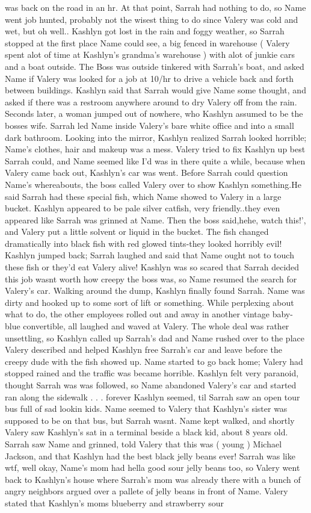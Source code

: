 \documentclass[12pt]{book}
\begin{document}
was back on the road in an hr. At that point, Sarrah had nothing to do, so Name went job hunted, probably not the wisest thing to do since Valery was cold and wet, but oh well.. Kashlyn got lost in the rain and foggy weather, so Sarrah stopped at the first place Name could see, a big fenced in warehouse ( Valery spent alot of time at Kashlyn's grandma's warehouse ) with alot of junkie cars and a boat outside. The Boss was outside tinkered with Sarrah's boat, and asked Name if Valery was looked for a job at 10/hr to drive a vehicle back and forth between buildings. Kashlyn said that Sarrah would give Name some thought, and asked if there was a restroom anywhere around to dry Valery off from the rain. Seconds later, a woman jumped out of nowhere, who Kashlyn assumed to be the bosses wife. Sarrah led Name inside Valery's bare white office and into a small dark bathroom. Looking into the mirror, Kashlyn realized Sarrah looked horrible; Name's clothes, hair and makeup was a mess. Valery tried to fix Kashlyn up best Sarrah could, and Name seemed like I'd was in there quite a while, because when Valery came back out, Kashlyn's car was went. Before Sarrah could question Name's whereabouts, the boss called Valery over to show Kashlyn something.He said Sarrah had these special fish, which Name showed to Valery in a large bucket. Kashlyn appeared to be pale silver catfish, very friendly..they even appeared like Sarrah was grinned at Name. Then the boss said,hehe, watch this!', and Valery put a little solvent or liquid in the bucket. The fish changed dramatically into black fish with red glowed tints-they looked horribly evil! Kashlyn jumped back; Sarrah laughed and said that Name ought not to touch these fish or they'd eat Valery alive! Kashlyn was so scared that Sarrah decided this job wasnt worth how creepy the boss was, so Name resumed the search for Valery's car. Walking around the dump, Kashlyn finally found Sarrah. Name was dirty and hooked up to some sort of lift or something. While perplexing about what to do, the other employees rolled out and away in another vintage baby-blue convertible, all laughed and waved at Valery. The whole deal was rather unsettling, so Kashlyn called up Sarrah's dad and Name rushed over to the place Valery described and helped Kashlyn free Sarrah's car and leave before the creepy dude with the fish showed up. Name started to go back home; Valery had stopped rained and the traffic was became horrible. Kashlyn felt very paranoid, thought Sarrah was was followed, so Name abandoned Valery's car and started ran along the sidewalk . . .  forever Kashlyn seemed, til Sarrah saw an open tour bus full of sad lookin kids. Name seemed to Valery that Kashlyn's sister was supposed to be on that bus, but Sarrah wasnt. Name kept walked, and shortly Valery saw Kashlyn's sat in a terminal beside a black kid, about 8 years old. Sarrah saw Name and grinned, told Valery that this was ( young ) Michael Jackson, and that Kashlyn had the best black jelly beans ever! Sarrah was like wtf, well okay, Name's mom had hella good sour jelly beans too, so Valery went back to Kashlyn's house where Sarrah's mom was already there with a bunch of angry neighbors argued over a pallete of jelly beans in front of Name. Valery stated that Kashlyn's moms blueberry and strawberry sour 
\end{document}
